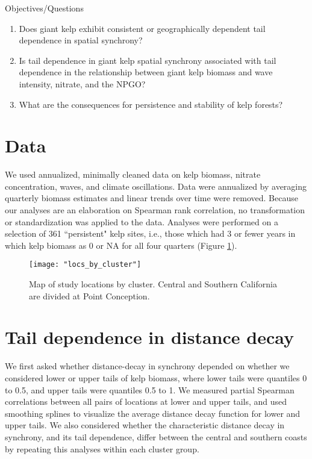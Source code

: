 \documentclass[12pt, oneside]{article}
\begin{document}
\noindent Objectives/Questions
\begin{enumerate}
\item{Does giant kelp exhibit consistent or geographically dependent tail dependence in spatial synchrony?}
\item{Is tail dependence in giant kelp spatial synchrony associated with tail dependence in the relationship between giant kelp biomass and wave intensity, nitrate, and the NPGO?}
\item{What are the consequences for persistence and stability of kelp forests?}
\end{enumerate}


\section{Data}

We used annualized, minimally cleaned data on kelp biomass, nitrate concentration, waves, and climate oscillations.
Data were annualized by averaging quarterly biomass estimates and linear trends over time were removed.
Because our analyses are an elaboration on Spearman rank correlation, no transformation or standardization was applied to the data.
Analyses were performed on a selection of 361 ``persistent" kelp sites, i.e., those which had 3 or fewer years in which kelp biomass as 0 or NA for all four quarters (Figure \ref{fig:sitemap}).

\begin{figure}
    \centering
    \texttt{[image: "locs\_by\_cluster"]}
    \caption{Map of study locations by cluster. Central and Southern California are divided at Point Conception.}
    \label{fig:sitemap}
\end{figure}

\section{Tail dependence in distance decay}

We first asked whether distance-decay in synchrony depended on whether we considered lower or upper tails of kelp biomass, where lower tails were quantiles 0 to 0.5, and upper tails were quantiles 0.5 to 1.
We measured partial Spearman correlations between all pairs of locations at lower and upper tails, and used smoothing splines to visualize the average distance decay function for lower and upper tails.
We also considered whether the characteristic distance decay in synchrony, and its tail dependence, differ between the central and southern coasts by repeating this analyses within each cluster group.
\end{document}
